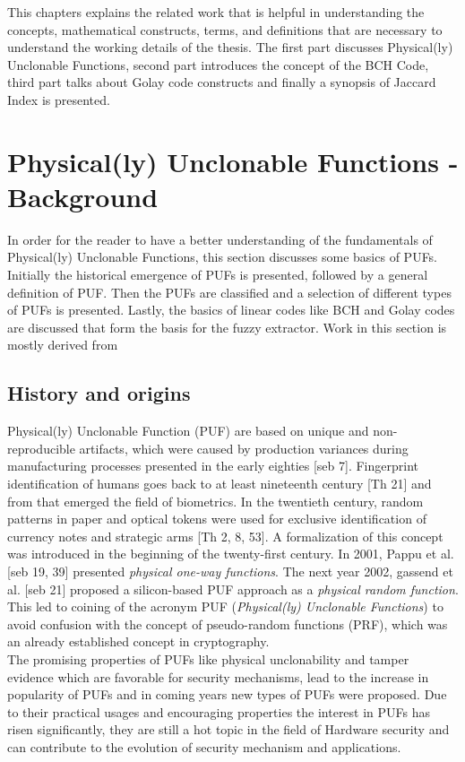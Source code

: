 This chapters explains the related work that is helpful in understanding the concepts, mathematical constructs, terms, and definitions that are necessary to understand the working details of the thesis. The first part discusses Physical(ly) Unclonable Functions, second part introduces the concept of the BCH Code, third part talks about Golay code constructs and finally a synopsis of Jaccard Index is presented.

\section{Physical(ly) Unclonable Functions - Background}
In order for the reader to have a better understanding of the fundamentals of Physical(ly) Unclonable Functions, this section discusses some basics of PUFs. Initially the historical emergence of PUFs is presented, followed by a general definition of PUF. Then the PUFs are classified and a selection of different types of PUFs is presented. Lastly, the basics of linear codes like BCH and Golay codes are discussed that form the basis for the fuzzy extractor. Work in this section is mostly derived
from \cite{17,18}\\

\subsection{History and origins}
Physical(ly) Unclonable Function (PUF) are based on unique and non-reproducible artifacts, which were caused by production variances during manufacturing processes presented in the early eighties [seb 7]. Fingerprint identification of humans goes back to at least nineteenth century [Th 21] and from that emerged the field of biometrics. In the twentieth century, random patterns in paper and optical tokens were used for exclusive identification of currency notes and strategic arms [Th 2, 8, 53]. A
formalization of this concept was introduced in the beginning of the twenty-first century. In 2001, Pappu et al. [seb 19, 39] presented \emph{physical one-way functions}. The next year 2002, gassend et al. [seb 21] proposed a silicon-based PUF approach as a \emph{physical random function}. This led to coining of the acronym PUF (\emph{Physical(ly) Unclonable Functions}) to avoid confusion with the concept of pseudo-random functions (PRF), which was an already established concept in cryptography.\\

The promising properties of PUFs like physical unclonability and tamper evidence which are favorable for security mechanisms, lead to the increase in popularity of PUFs and in coming years new types of PUFs were proposed. Due to their practical usages and encouraging properties the interest in PUFs has risen significantly, they are still a hot topic in the field of Hardware security and can contribute to the evolution of security mechanism and applications.\\

